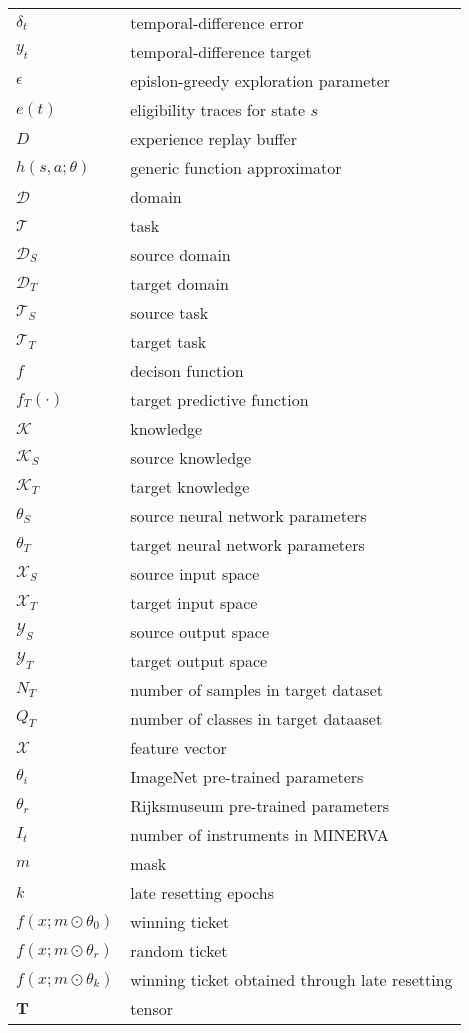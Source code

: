 \begin{tabularx}{\textwidth}{ l X }
	$\delta_t$ & temporal-difference error \\ 
$y_t$ & temporal-difference target \\ 
$\epsilon$ & epislon-greedy exploration parameter \\
$e(t)$ & eligibility traces for state $s$ \\
$D$ & experience replay buffer \\
$h(s,a;\theta)$ & generic function approximator \\ 	
	$\mathcal{D}$ & domain \\ 
	$\mathcal{T}$ & task \\ 
	$\mathcal{D}_S$ & source domain \\ 
	$\mathcal{D}_T$ & target domain \\ 
	$\mathcal{T}_S$ & source task \\
	$\mathcal{T}_T$ & target task \\
	$f$ & decison function \\ 
	$f_T(\cdot)$ & target predictive function \\
	$\mathcal{K}$ & knowledge \\ 
	$\mathcal{K}_S$ & source knowledge \\
	$\mathcal{K}_T$ & target knowledge \\
	$\theta_S$ & source neural network parameters \\ 
	$\theta_T$ & target neural network parameters \\
	$\mathcal{X}_S$ & source input space \\
	$\mathcal{X}_T$ & target input space \\ 
	$\mathcal{Y}_S$ & source output space \\
	$\mathcal{Y}_T$ & target output space \\
	$N_T$ & number of samples in target dataset \\ 
	$Q_T$ & number of classes in target dataaset \\	
	$\mathscr{X}$ & feature vector \\
	$\theta_i$ & ImageNet pre-trained parameters \\ 
	$\theta_r$ & Rijksmuseum pre-trained parameters \\
	$I_t$ & number of instruments in MINERVA \\ 
	$m$ & mask \\
	$k$ & late resetting epochs \\
	$f(x;m\odot\theta_0)$ & winning ticket \\
	$f(x;m\odot\theta_r)$ & random ticket \\ 
	$f(x;m\odot\theta_k)$ & winning ticket obtained through late resetting \\
	$\mathbf{T}$ & tensor \\ 
		
\end{tabularx}
\clearpage


